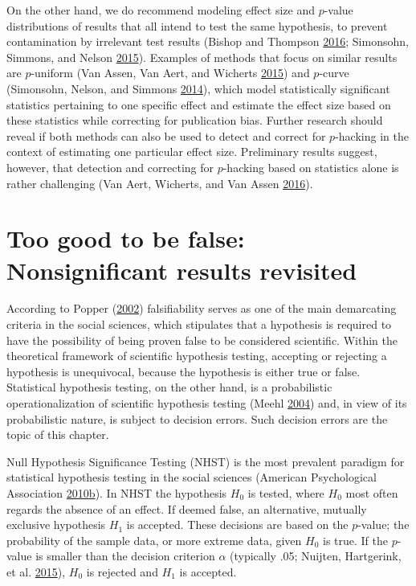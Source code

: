 \documentclass[a5paper]{book}
\begin{document}
On the other hand, we do recommend modeling effect size and \(p\)-value
distributions of results that all intend to test the same hypothesis, to
prevent contamination by irrelevant test results (Bishop and Thompson
\protect\hyperlink{ref-doi:10.7717ux2fpeerj.1715}{2016}; Simonsohn,
Simmons, and Nelson
\protect\hyperlink{ref-doi:10.1037ux2fxge0000104}{2015}). Examples of
methods that focus on similar results are \(p\)-uniform (Van Assen, Van
Aert, and Wicherts
\protect\hyperlink{ref-doi:10.1037ux2fmet0000025}{2015}) and \(p\)-curve
(Simonsohn, Nelson, and Simmons
\protect\hyperlink{ref-doi:10.1037ux2fa0033242}{2014}), which model
statistically significant statistics pertaining to one specific effect
and estimate the effect size based on these statistics while correcting
for publication bias. Further research should reveal if both methods can
also be used to detect and correct for \(p\)-hacking in the context of
estimating one particular effect size. Preliminary results suggest,
however, that detection and correcting for \(p\)-hacking based on
statistics alone is rather challenging (Van Aert, Wicherts, and Van
Assen \protect\hyperlink{ref-doi:10.1177ux2f1745691616650874}{2016}).

\chapter{Too good to be false: Nonsignificant results
revisited}\label{too-good-to-be-false-nonsignificant-results-revisited}

According to Popper (\protect\hyperlink{ref-isbn:9780415278430}{2002})
falsifiability serves as one of the main demarcating criteria in the
social sciences, which stipulates that a hypothesis is required to have
the possibility of being proven false to be considered scientific.
Within the theoretical framework of scientific hypothesis testing,
accepting or rejecting a hypothesis is unequivocal, because the
hypothesis is either true or false. Statistical hypothesis testing, on
the other hand, is a probabilistic operationalization of scientific
hypothesis testing (Meehl
\protect\hyperlink{ref-doi:10.1016ux2fj.appsy.2004.02.001}{2004}) and,
in view of its probabilistic nature, is subject to decision errors. Such
decision errors are the topic of this chapter.

Null Hypothesis Significance Testing (NHST) is the most prevalent
paradigm for statistical hypothesis testing in the social sciences
(American Psychological Association
\protect\hyperlink{ref-isbn:9781433805615}{2010}\protect\hyperlink{ref-isbn:9781433805615}{b}).
In NHST the hypothesis \(H_0\) is tested, where \(H_0\) most often
regards the absence of an effect. If deemed false, an alternative,
mutually exclusive hypothesis \(H_1\) is accepted. These decisions are
based on the \(p\)-value; the probability of the sample data, or more
extreme data, given \(H_0\) is true. If the \(p\)-value is smaller than
the decision criterion \(\alpha\) (typically .05; Nuijten, Hartgerink,
et al. \protect\hyperlink{ref-doi:10.3758ux2fs13428-015-0664-2}{2015}),
\(H_0\) is rejected and \(H_1\) is accepted.
\end{document}
